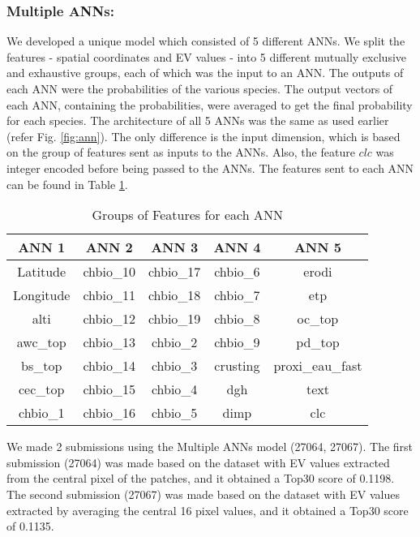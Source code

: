 \documentclass[runningheads]{llncs}
\begin{document}
\subsubsection{Multiple ANNs:}
We developed a unique model which consisted of 5 different ANNs. We split the features - spatial coordinates and EV values - into 5 different mutually exclusive and exhaustive groups, each of which was the input to an ANN. The outputs of each ANN were the probabilities of the various species. The output vectors of each ANN, containing the probabilities, were averaged to get the final probability for each species. The architecture of all 5 ANNs was the same as used earlier (refer Fig. \ref{fig:ann}). The only difference is the input dimension, which is based on the group of features sent as inputs to the ANNs. Also, the feature $clc$ was integer encoded before being passed to the ANNs. The features sent to each ANN can be found in Table \ref{table:manns}.
\begin{table}[]
\centering
\setlength{\abovecaptionskip}{20pt}
\setlength{\belowcaptionskip}{-7pt}
\begin{tabular}{|c|c|c|c|c|}
\hline
\textbf{ANN 1} & \textbf{ANN 2} & \textbf{ANN 3} & \textbf{ANN 4} & \textbf{ANN 5} \\ \hline
Latitude & chbio\_10 & chbio\_17 & chbio\_6 & erodi \\
Longitude & chbio\_11 & chbio\_18 & chbio\_7 & etp \\
alti & chbio\_12 & chbio\_19 & chbio\_8 & oc\_top \\
awc\_top & chbio\_13 & chbio\_2 & chbio\_9 & pd\_top \\
bs\_top & chbio\_14 & chbio\_3 & crusting & proxi\_eau\_fast \\
cec\_top & chbio\_15 & chbio\_4 & dgh & text \\
chbio\_1 & chbio\_16 & chbio\_5 & dimp & clc \\ \hline
\end{tabular}
\caption{Groups of Features for each ANN}
\label{table:manns}
\end{table}
\newline
\noindent We made 2 submissions using the Multiple ANNs model (27064, 27067). The first submission (27064) was made based on the dataset with EV values extracted from the central pixel of the patches, and it obtained a Top30 score of 0.1198. The second submission (27067) was made based on the dataset with EV values extracted by averaging the central 16 pixel values, and it obtained a Top30 score of 0.1135.
\end{document}
